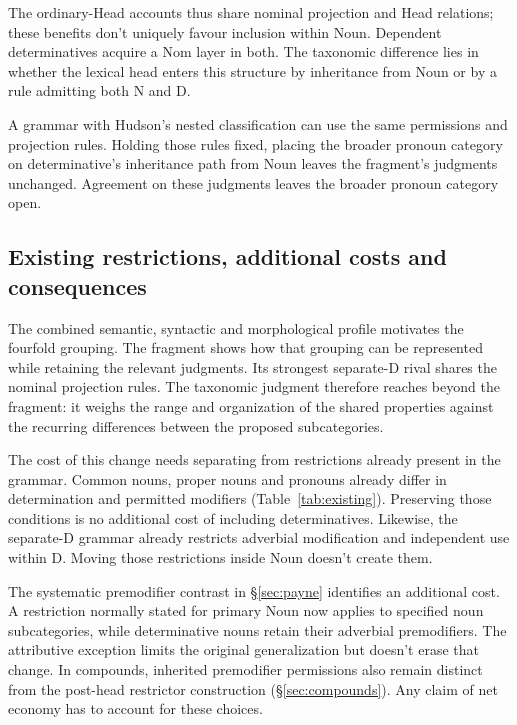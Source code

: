 \documentclass[12pt]{article}
\begin{document}
The ordinary-Head accounts thus share nominal projection and Head relations; these benefits don't uniquely favour inclusion within Noun. Dependent determinatives acquire a Nom layer in both. The taxonomic difference lies in whether the lexical head enters this structure by inheritance from Noun or by a rule admitting both N and D.

A grammar with Hudson's nested classification can use the same permissions and projection rules. Holding those rules fixed, placing the broader pronoun category on determinative's inheritance path from Noun leaves the fragment's judgments unchanged. Agreement on these judgments leaves the broader pronoun category open.

\subsection{Existing restrictions, additional costs and consequences}\label{sec:costs}

The combined semantic, syntactic and morphological profile motivates the fourfold grouping. The fragment shows how that grouping can be represented while retaining the relevant judgments. Its strongest separate-D rival shares the nominal projection rules. The taxonomic judgment therefore reaches beyond the fragment: it weighs the range and organization of the shared properties against the recurring differences between the proposed subcategories.

The cost of this change needs separating from restrictions already present in the grammar. Common nouns, proper nouns and pronouns already differ in determination and permitted modifiers (Table~\ref{tab:existing}). Preserving those conditions is no additional cost of including determinatives. Likewise, the separate-D grammar already restricts adverbial modification and independent use within D. Moving those restrictions inside Noun doesn't create them.

The systematic premodifier contrast in §\ref{sec:payne} identifies an additional cost. A restriction normally stated for primary Noun now applies to specified noun subcategories, while determinative nouns retain their adverbial premodifiers. The attributive  exception limits the original generalization but doesn't erase that change. In compounds, inherited premodifier permissions also remain distinct from the post-head restrictor construction (§\ref{sec:compounds}). Any claim of net economy has to account for these choices.
\end{document}
